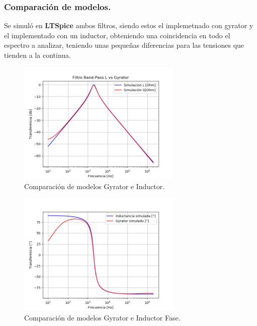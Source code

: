 \documentclass[a4paper]{article}
\begin{document}
\subsubsection{Comparación de modelos.}
Se simuló en \textbf{LTSpice} ambos filtros, siendo estos el implemetnado con gyrator y el implementado con un inductor, obteniendo una coincidencia en todo el espectro a analizar, teniendo unas pequeñas diferencias para las tensiones que tienden a la continua.
\begin{figure}[H]	
	\centering
	\includegraphics[width=0.7\textwidth]{ImagenesEj2/simBP.PNG}
	\caption{Comparación de modelos Gyrator e Inductor.}
	\label{fig:gyrIndBP}
\end{figure}
\begin{figure}[H]	
	\centering
	\includegraphics[width=0.7\textwidth]{ImagenesEj2/simBPP.PNG}
	\caption{Comparación de modelos Gyrator e Inductor Fase.}
	\label{fig:gyrIndPBP}
\end{figure}
\end{document}
